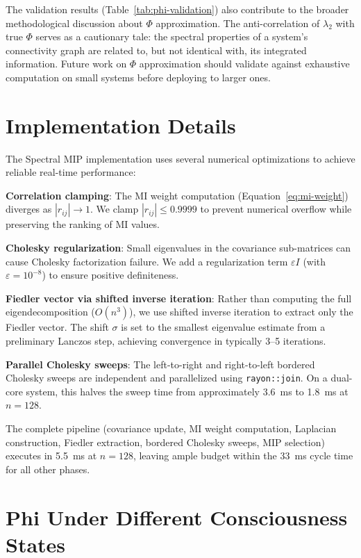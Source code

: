 \documentclass[12pt]{book}
\begin{document}
The validation results (Table~\ref{tab:phi-validation}) also contribute to the broader methodological discussion about $\Phi$ approximation. The anti-correlation of $\lambda_2$ with true $\Phi$ serves as a cautionary tale: the spectral properties of a system's connectivity graph are related to, but not identical with, its integrated information. Future work on $\Phi$ approximation should validate against exhaustive computation on small systems before deploying to larger ones.

\section{Implementation Details}

The Spectral MIP implementation uses several numerical optimizations to achieve reliable real-time performance:

\textbf{Correlation clamping}: The MI weight computation (Equation~\ref{eq:mi-weight}) diverges as $|r_{ij}| \to 1$. We clamp $|r_{ij}| \leq 0.9999$ to prevent numerical overflow while preserving the ranking of MI values.

\textbf{Cholesky regularization}: Small eigenvalues in the covariance sub-matrices can cause Cholesky factorization failure. We add a regularization term $\varepsilon I$ (with $\varepsilon = 10^{-8}$) to ensure positive definiteness.

\textbf{Fiedler vector via shifted inverse iteration}: Rather than computing the full eigendecomposition ($O(n^3)$), we use shifted inverse iteration to extract only the Fiedler vector. The shift $\sigma$ is set to the smallest eigenvalue estimate from a preliminary Lanczos step, achieving convergence in typically 3--5 iterations.

\textbf{Parallel Cholesky sweeps}: The left-to-right and right-to-left bordered Cholesky sweeps are independent and parallelized using \texttt{rayon::join}. On a dual-core system, this halves the sweep time from approximately 3.6~ms to 1.8~ms at $n = 128$.

The complete pipeline (covariance update, MI weight computation, Laplacian construction, Fiedler extraction, bordered Cholesky sweeps, MIP selection) executes in 5.5~ms at $n = 128$, leaving ample budget within the 33~ms cycle time for all other phases.

\section{Phi Under Different Consciousness States}
\end{document}
